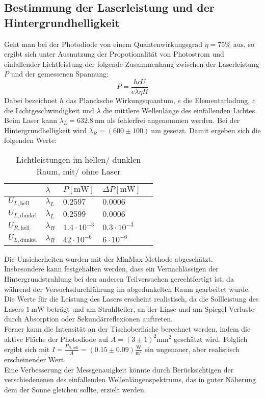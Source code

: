 \documentclass[11pt,a4paper,oneside]{scrartcl}
\begin{document}
\subsection{Bestimmung der Laserleistung und der Hintergrundhelligkeit}
Geht man bei der Photodiode von einem Quantenwirkungsgrad $\eta=75\%$ aus, so ergibt sich unter Ausnutzung der Propotionalität von Photostrom und einfallender Lichtleistung der folgende Zusammenhang zwischen der Laserleistung $P$ und der gemessenen Spannung:
\begin{equation}\label{P_diode}
P=\frac{hcU}{e\lambda\eta R}
\end{equation}
Dabei bezeichnet $h$ das Plancksche Wirkungsquantum, $e$ die Elementarladung, $c$ die Lichtgeschwindigkeit und $\lambda$ die mittlere Wellenlänge des einfallenden Lichtes. Beim Laser kann $\lambda_L=632.8\ \mathrm{nm}$ als fehlerfrei angenommen werden. Bei der Hintergrundhelligkeit wird $\lambda_R=(600\pm 100)\ \mathrm{nm}$ gesetzt.
Damit ergeben sich die folgenden Werte:\\
\begin{table}[H]
\centering
\begin{tabular}{@{}lllll@{}}
\toprule
                        & $\lambda$   & $P [\mathrm{mW}]$  & $\Delta P[\mathrm{mW}]$ &  \\ \midrule
$U_{L,\mathrm{hell}}$   & $\lambda_L$ & $0.2597$           & $0.0006$                &  \\
$U_{L,\mathrm{dunkel}}$ & $\lambda_L$ & $0.2599$           & $0.0006$                &  \\
$U_{R,\mathrm{hell}}$   & $\lambda_R$ & $1.4\cdot 10^{-3}$ & $0.3\cdot 10^{-3}$      &  \\
$U_{L,\mathrm{dunkel}}$ & $\lambda_R$ & $42\cdot 10^{-6}$  & $6\cdot10^{-6}$         &  \\ \bottomrule
\end{tabular}
\caption{Lichtleistungen im hellen/ dunklen Raum, mit/ ohne Laser}
\end{table}
Die Unsicherheiten wurden mit der MinMax-Methode abgeschätzt.\\
Insbesondere kann festgehalten werden, dass ein Vernachlässigen der Hintergrundstrahlung bei den anderen Teilversuchen gerechtfertigt ist, da während der Versuchsdurchführung im abgedunkelten Raum gearbeitet wurde. Die Werte für die Leistung des Lasers erscheint realistisch, da die Sollleistung des Lasers $1\ \mathrm{mW}$ beträgt und am Strahlteiler, an der Linse und am Spiegel Verluste durch Absorption oder Sekundärreflexionen auftreten.\\
Ferner kann die Intensität an der Tischoberfläche berechnet werden, indem die aktive Fläche der Photodiode auf $A=(3\pm1)^2\mathrm{mm}^2$ geschätzt wird. Folglich ergibt sich mit $I=\frac{P_{R,\mathrm{hell}}}{A}=(0.15\pm0.09)\frac{\mathrm{W}}{\mathrm m^2}$ ein ungenauer, aber realistisch erscheinender Wert. \\
Eine Verbesserung der Messgenauigkeit könnte durch Berücksichtigen der verschiedenenen des einfallenden Wellenlängenspektrums, das in guter Näherung dem der Sonne gleichen sollte, erzielt werden.
\end{document}
